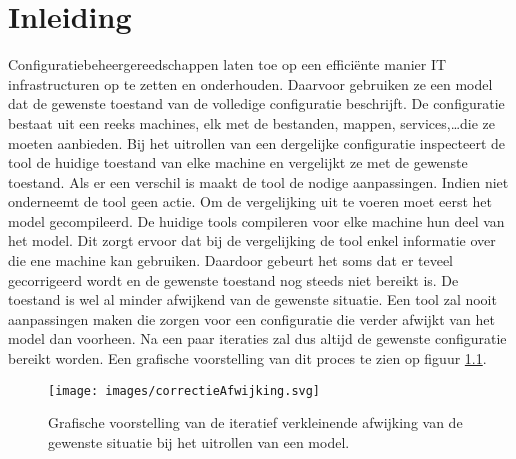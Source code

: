 \chapter{Inleiding}
\label{inleiding}
Configuratiebeheergereedschappen laten toe op een effici\"ente manier IT infrastructuren op te zetten en onderhouden.
Daarvoor gebruiken ze een model dat de gewenste toestand van de volledige configuratie beschrijft.
De configuratie bestaat uit een reeks machines, elk met de bestanden, mappen, services,\ldots die ze moeten aanbieden.
Bij het uitrollen van een dergelijke configuratie inspecteert de tool de huidige toestand van elke machine en vergelijkt ze met de gewenste
toestand.
Als er een verschil is maakt de tool de nodige aanpassingen. Indien niet onderneemt de tool geen actie.
Om de vergelijking uit te voeren moet eerst het model gecompileerd.
De huidige tools compileren voor elke machine hun deel van het model.
Dit zorgt ervoor dat bij de vergelijking de tool enkel informatie over die ene machine kan gebruiken.
Daardoor gebeurt het soms dat er teveel gecorrigeerd wordt en de gewenste toestand nog steeds niet bereikt is.
De toestand is wel al minder afwijkend van de gewenste situatie.
Een tool zal nooit aanpassingen maken die zorgen voor een configuratie die verder afwijkt van het model dan voorheen.
Na een paar iteraties zal dus altijd de gewenste configuratie bereikt worden.
Een grafische voorstelling van dit proces te zien op figuur \ref{fig:correctieAfwijking}.

\begin{figure}[p]
    \centering
    \texttt{[image: images/correctieAfwijking.svg]}
    \caption{Grafische voorstelling van de iteratief verkleinende afwijking van de gewenste situatie bij het uitrollen van een model.}
    \label{fig:correctieAfwijking}
\end{figure}


